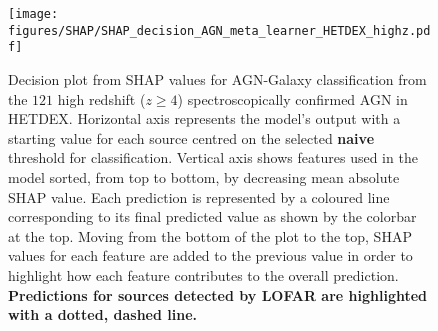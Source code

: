 \documentclass{aa}
\begin{document}
\begin{figure}[t]
    \centering
    \begin{minipage}{0.75\columnwidth}
    \texttt{[image: figures/SHAP/SHAP\_decision\_AGN\_meta\_learner\_HETDEX\_highz.pdf]}
    \end{minipage}%
    \caption{Decision plot from SHAP values for AGN-Galaxy classification from the $121$ high redshift ($z \geq 4$) spectroscopically confirmed AGN in HETDEX. Horizontal axis represents the model's output with a starting value for each source centred on the selected \textbf{naive} threshold for classification. Vertical axis shows features used in the model sorted, from top to bottom, by decreasing mean absolute SHAP value. Each prediction is represented by a coloured line corresponding to its final predicted value as shown by the colorbar at the top. Moving from the bottom of the plot to the top, SHAP values for each feature are added to the previous value in order to highlight how each feature contributes to the overall prediction. \textbf{Predictions for sources detected by LOFAR are highlighted with a dotted, dashed line.}}
   \label{fig:SHAP_decision_AGN_meta_HETDEX_high_z}
\end{figure}
\end{document}
